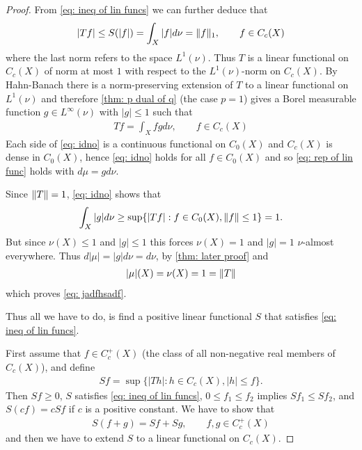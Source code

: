 \begin{proof}
From \eqref{eq: ineq of lin funcs} we can further deduce that
\begin{align*}
	|Tf| \le S(|f|) = \int_{X} |f| d\nu = \Vert{f}\Vert_{1}, \qquad f\in C_{c}(X)
\end{align*}
where the last norm refers to the space $L^{1}(\nu)$. Thus $T$ is a linear functional on $C_{c}(X)$ of norm at most $1$ with respect to the $L^{1}(\nu)$-norm on $C_{c}(X)$. By Hahn-Banach there is a norm-preserving extension of $T$ to a linear functional on $L^{1}(\nu)$ and therefore \cref{thm: p dual of q} (the case $p=1$) gives a Borel measurable function $g\in L^{\infty}(\nu)$ with $|g| \le 1$ such that
\begin{align}
	Tf=\int_{X}fgd\nu, \qquad f\in C_{c}(X) \label{eq: idno}
\end{align}
Each side of \eqref{eq: idno} is a continuous functional on $C_{0}(X)$ and $C_{c}(X)$ is dense in $C_{0}(X)$, hence \eqref{eq: idno} holds for all $f\in C_{0}(X)$ and so \eqref{eq: rep of lin func} holds with $d\mu=g d\nu$.

Since $\Vert{T}\Vert=1$, \eqref{eq: idno} shows that
\begin{align*}
	\int_{X} |g| d\nu \ge \sup\{ |Tf| : f\in C_{0}(X), \Vert{f}\Vert \le 1 \} = 1.
\end{align*}
But since $\nu(X) \le 1$ and $|g| \le 1$ this forces $\nu(X)=1$ and $|g|=1$ $\nu$-almost everywhere. Thus $d|\mu| = |g| d\nu = d\nu$, by \cref{thm: later proof} and
\begin{align*}
	|\mu| (X) = \nu(X) = 1 = \Vert{T}\Vert
\end{align*}
which proves \eqref{eq: jadfhsadf}.

Thus all we have to do, is find a positive linear functional $S$ that satisfies \eqref{eq: ineq of lin funcs}.

First assume that $f\in C_{c}^{+}(X)$ (the class of all non-negative real members of $C_{c}(X)$), and define
\begin{align*}
	Sf=\sup\{ |Th| : h\in C_{c}(X), |h| \le f \}.
\end{align*}
Then $Sf \ge 0$, $S$ satisfies \eqref{eq: ineq of lin funcs}, $0 \le f_{1} \le f_{2}$ implies $Sf_{1} \le Sf_{2}$, and $S(cf)=cSf$ if $c$ is a positive constant. We have to show that
\begin{align}
	S(f+g)=Sf+Sg, \qquad f,g\in C_{c}^{+}(X) \label{eq: linearity}
\end{align}
and then we have to extend $S$ to a linear functional on $C_{c}(X)$.


\end{proof}
